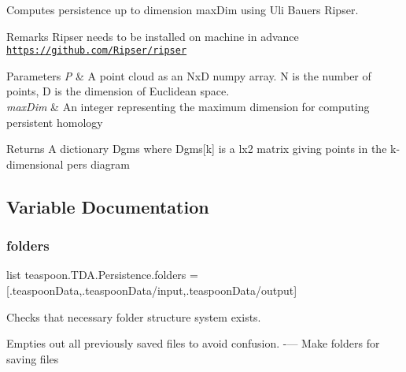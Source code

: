 Computes persistence up to dimension max\+Dim using Uli Bauer\textquotesingle{}s Ripser. 

\begin{DoxyRemark}{Remarks}
Ripser needs to be installed on machine in advance \href{https://github.com/Ripser/ripser}{\tt https\+://github.\+com/\+Ripser/ripser}
\end{DoxyRemark}

\begin{DoxyParams}{Parameters}
{\em P} & A point cloud as an NxD numpy array. N is the number of points, D is the dimension of Euclidean space. \\
\hline
{\em max\+Dim} & An integer representing the maximum dimension for computing persistent homology\\
\hline
\end{DoxyParams}
\begin{DoxyReturn}{Returns}
A dictionary Dgms where Dgms\mbox{[}k\mbox{]} is a lx2 matrix giving points in the k-\/dimensional pers diagram 
\end{DoxyReturn}


\subsection{Variable Documentation}
\mbox{\label{namespaceteaspoon_1_1_t_d_a_1_1_persistence_a5d89c08933153d3fea60fd71e9e16800}} 
\subsubsection{\texorpdfstring{folders}{folders}}
{\footnotesize\ttfamily list teaspoon.\+T\+D\+A.\+Persistence.\+folders = \mbox{[}\textquotesingle{}.teaspoon\+Data\textquotesingle{},\textquotesingle{}.teaspoon\+Data/input\textquotesingle{},\textquotesingle{}.teaspoon\+Data/output\textquotesingle{}\mbox{]}}



Checks that necessary folder structure system exists. 

Empties out all previously saved files to avoid confusion. -\/--- Make folders for saving files \mbox{\label{namespaceteaspoon_1_1_t_d_a_1_1_persistence_ae41c85513e98b32d96c75124929c4d2c}} 
